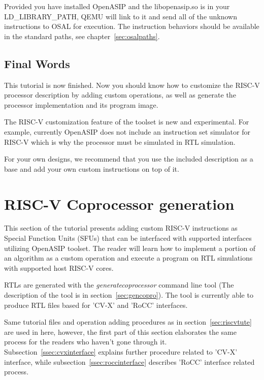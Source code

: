 \documentclass[a4paper,twoside]{tceusermanual}
\begin{document}
Provided you have installed OpenASIP and the libopenasip.so is in your LD\_LIBRARY\_PATH,
QEMU will link to it and send all of the unknown instructions to OSAL for execution.
The instruction behaviors should be available in the standard paths, 
see chapter~\ref{sec:osalpaths}.

\subsection{Final Words}

This tutorial is now finished. Now you should know how to customize
the RISC-V processor description by adding custom operations,
as well as generate the processor implementation and its program image.

The RISC-V customization feature of the toolset is new and experimental.
For example, currently OpenASIP does not include an instruction set simulator
for RISC-V which is why the processor must be simulated in RTL simulation.

For your own designs, we recommend that you use the included 
description as a base and add your own custom instructions on top of it.

\section{RISC-V Coprocessor generation}
\label{sec:coproriscv}

This section of the tutorial presents adding custom RISC-V instructions as Special 
Function Units (SFUs) that can be interfaced with supported interfaces utilizing 
OpenASIP toolset. The reader will learn how to implement a portion of an 
algorithm as a custom operation and execute a program on RTL simulations with 
supported host RISC-V cores. 

RTLs are generated with the \textit{generatecoprocessor} command line tool (The description 
of the tool is in section~\ref{sec:gencopro}). The tool is currently able to produce RTL files 
based for 'CV-X' and 'RoCC' interfaces. 

Same tutorial files and operation adding procedures as in section~\ref{sec:riscvtute} are used 
in here, however, the first part of this section elaborates the same process for the readers who 
haven't gone through it. Subsection~\ref{ssec:cvxinterface} explains further procedure related to 
'CV-X' interface, while subsection~\ref{ssec:roccinterface} describes 'RoCC' interface related process.
\end{document}
